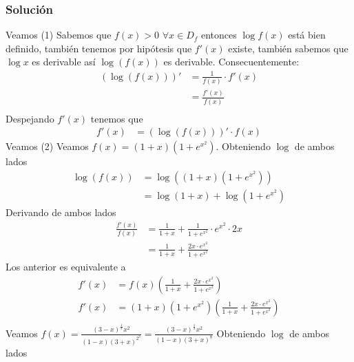 \documentclass[a4paper]{article}
\begin{document}
\subsubsection*{Solución}
Veamos (1)
\newline 
Sabemos que \(f(x) > 0\) \(\forall x \in D_{f}\) entonces \(\log{f(x)}\) está bien definido, 
también tenemos por hipótesis que \(f'(x)\) existe, también sabemos que \(\log{x}\) es derivable 
así \(\log{\left(f(x)\right)}\) es derivable. Consecuentemente:
\begin{align*}
    \left(\log{\left(f(x)\right)}\right)' &= \frac{1}{f(x)} \cdot f'(x) \\
                                          &= \frac{f'(x)}{f(x)} \\
\end{align*}
Despejando \(f'(x)\) tenemos que 
\begin{align*}
    f'(x) &= \left(\log{\left(f(x)\right)}\right)' \cdot f(x)
\end{align*}
Veamos (2)
\newline
Veamos \(f(x) = \left(1 + x\right)\left(1 + e^{x^2}\right)\). 
\newline 
Obteniendo \(\log\) de ambos lados
\begin{align*}
    \log{\left(f(x)\right)} &= \log{\left(\left(1 + x\right)\left(1 + e^{x^2}\right)\right)} \\
                            &= \log{\left(1 + x\right)} +  \log{\left(1 + e^{x^2}\right)}
\end{align*}
Derivando de ambos lados
\begin{align*}
    \frac{f'(x)}{f(x)} &= \frac{1}{1 + x} + \frac{1}{1 + e^{x^{2}}} \cdot e^{x^2} \cdot 2x \\
                       &= \frac{1}{1 + x} + \frac{2x\cdot e^{x^2}}{1 + e^{x^{2}}}
\end{align*}
Los anterior es equivalente a 
\begin{align*}
    f'(x) &= f(x) \left(\frac{1}{1 + x} + \frac{2x\cdot e^{x^2}}{1 + e^{x^{2}}}\right)  \\
    f'(x) &= \left(1 + x\right)\left(1 + e^{x^2}\right) \left(\frac{1}{1 + x} + \frac{2x\cdot e^{x^2}}{1 + e^{x^{2}}}\right)  \\
\end{align*}
Veamos \(f(x) = \frac{(3 - x)^{\frac{1}{3}}x^2}{(1 - x)(3 + x)^{2^{3}}} = \frac{(3 - x)^{\frac{1}{3}}x^2}{(1 - x)(3 + x)^{8}}\)
\newline
Obteniendo \(\log\) de ambos lados
\end{document}
